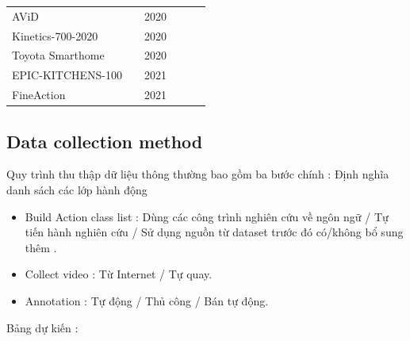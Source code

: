 \documentclass[a4paper]{article}
\begin{document}
\begin{table}[h]
\begin{tabular}{l|c|c|c c c}
		AViD                    & \cite{AViD}               & 2020 &              &           & \cmark         \\
		Kinetics-700-2020       & \cite{Kinetics-700-2020}  & 2020 &              &           & \cmark         \\
		Toyota Smarthome        & \cite{ToyotaSmarthome}    & 2020 & \cmark       &           & \cmark         \\
		EPIC-KITCHENS-100       & \cite{EPICKITCHENS100}    & 2021 & \cmark       &           & \cmark         \\	
		FineAction              & \cite{FineAction}         & 2021 & \cmark       &           &                \\
		\bottomrule
 		
	\end{tabular}%
	\label{characteristic}
\end{table}%

\subsection{Data collection method}

Quy trình thu thập dữ liệu thông thường bao gồm ba bước chính : Định nghĩa danh sách các lớp hành động

\begin{itemize}
	\item Build Action class list : Dùng các công trình nghiên cứu về ngôn ngữ / Tự tiến hành nghiên cứu / Sử dụng nguồn từ dataset trước đó có/không bổ sung thêm .
	\item Collect video : Từ Internet / Tự quay.
	\item Annotation : Tự động / Thủ công / Bán tự động.
\end{itemize}

Bảng dự kiến : 
\end{document}
